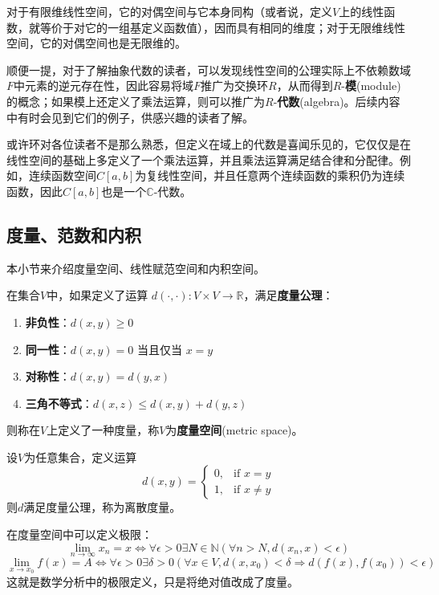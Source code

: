 对于有限维线性空间，它的对偶空间与它本身同构（或者说，定义$V$上的线性函数，就等价于对它的一组基定义函数值），因而具有相同的维度；对于无限维线性空间，它的对偶空间也是无限维的。

顺便一提，对于了解抽象代数的读者，可以发现线性空间的公理实际上不依赖数域$F$中元素的逆元存在性，因此容易将域$F$推广为交换环$R$，从而得到$R$-\textbf{模}(module)的概念；如果模上还定义了乘法运算，则可以推广为$R$-\textbf{代数}(algebra)。后续内容中有时会见到它们的例子，供感兴趣的读者了解。

\begin{example}
    或许环对各位读者不是那么熟悉，但定义在域上的代数是喜闻乐见的，它仅仅是在线性空间的基础上多定义了一个乘法运算，并且乘法运算满足结合律和分配律。例如，连续函数空间$C[a,b]$为复线性空间，并且任意两个连续函数的乘积仍为连续函数，因此$C[a,b]$也是一个$\mathbb{C}$-代数。
\end{example}

\subsection{度量、范数和内积}\label{sub:measurement}

本小节来介绍度量空间、线性赋范空间和内积空间\cite{linear_algebra}。
\begin{definition}[度量]
    在集合$V$中，如果定义了运算
$d(\cdot,\cdot):V\times V\rightarrow \mathbb{R}  $，满足\textbf{度量公理}：
\begin{enumerate}
    \item \textbf{非负性}：$d(x, y) \geq 0$
    \item \textbf{同一性}：$d(x, y) = 0$ 当且仅当 $x = y$
    \item \textbf{对称性}：$d(x, y) = d(y, x)$
    \item \textbf{三角不等式}：$d(x, z) \leq d(x, y) + d(y, z)$
\end{enumerate}
则称在$V$上定义了一种度量，称$V$为\textbf{度量空间}(metric space)。
\end{definition}

\begin{example}[离散度量]
    设$V$为任意集合，定义运算
    \[
    d(x,y) = \begin{cases}
    0, & \text{if } x = y \\
    1, & \text{if } x \neq y
    \end{cases}
    \]
    则$d$满足度量公理，称为离散度量。
\end{example}

在度量空间中可以定义极限：
\[\lim_{n\to\infty}x_n=x\iff \forall \epsilon>0\exists N\in\mathbb{N} (\forall n>N,d(x_n,x)<\epsilon)\]
\[\lim_{x\to x_0}f(x)=A\iff \forall \epsilon>0\exists \delta>0(\forall x\in V,d(x,x_0)<\delta\Rightarrow d(f(x),f(x_0))<\epsilon)\]
这就是数学分析中的极限定义，只是将绝对值改成了度量。

